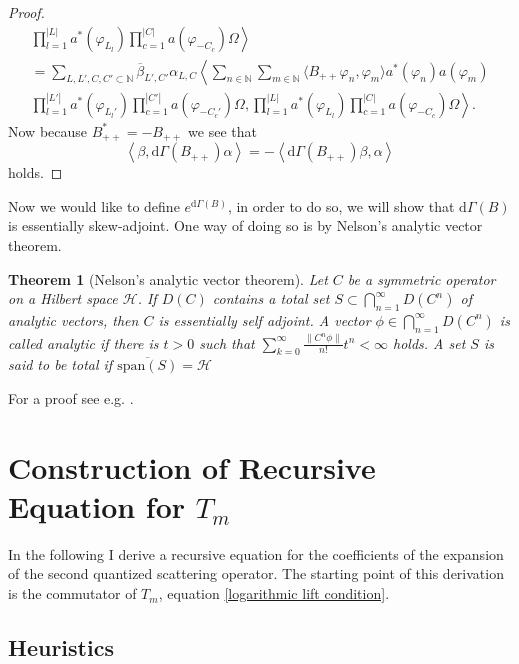 \documentclass[b5paper,draft,openbib,12pt]{memoir}
\newtheorem{Thm}[Def]{Theorem}
\begin{document}
\begin{proof}
\begin{align}
\left.  \prod_{l=1}^{|L|}a^*(\varphi_{L_l})\prod_{c=1}^{|C|} a(\varphi_{-C_c})\Omega\right\rangle\\\nonumber
= \sum_{L,L',C,C'\subset \mathbb{N}} \overline{\beta}_{L',C'}\alpha_{L,C} 
\left\langle \sum_{n\in\mathbb{N}} \sum_{m\in\mathbb{N}} \langle B_{++}\varphi_n,\varphi_m\rangle a^*(\varphi_n) a(\varphi_{m})\right. \\ \nonumber
\left. \prod_{l=1}^{|L'|}a^*(\varphi_{L_l'})\prod_{c=1}^{|C'|} a(\varphi_{-C_c'})\Omega, \prod_{l=1}^{|L|}a^*(\varphi_{L_l})\prod_{c=1}^{|C|} a(\varphi_{-C_c})\Omega\right\rangle.
\end{align}
Now because \(B_{++}^*=-B_{++}\) we see that 
\begin{equation}
\left\langle \beta, \mathrm{d}\Gamma(B_{++})\alpha\right\rangle =- \left\langle \mathrm{d}\Gamma(B_{++})\beta, \alpha\right\rangle 
\end{equation}
holds.
\end{proof}



Now we would like to define \(e^{\mathrm{d}\Gamma(B)}\), in order to do so, we will show that \(\mathrm{d}\Gamma(B)\) is essentially skew-adjoint. 
One way of doing so is by Nelson's analytic vector theorem. 

\begin{Thm}[Nelson's analytic vector theorem]
Let \(C\) be a symmetric operator on a Hilbert space \(\mathscr{H}\). If \(D(C)\) contains a total set 
\(S\subset \bigcap_{n=1}^\infty D(C^n)\) of analytic vectors, then \(C\) is essentially self adjoint. 
A vector \(\phi\in \bigcap_{n=1}^\infty D(C^n)\) is called analytic if there is \(t>0\) such that
\(\sum_{k=0}^\infty \frac{\|C^n \phi\|}{n!} t^n<\infty\) holds. A set \(S\) is said to be total if \(\overline{\text{span}(S)}=\mathscr{H}\)
\end{Thm}
For a proof see e.g. \cite{SimonReed2}.



\section{Construction of Recursive Equation for \(T_m\)}

In the following I derive a recursive equation for the coefficients of the expansion 
of the second quantized scattering operator. The starting point of this derivation is 
the commutator of \(T_m\), equation \eqref{logarithmic lift condition}.

\subsection{Heuristics}
\end{document}
